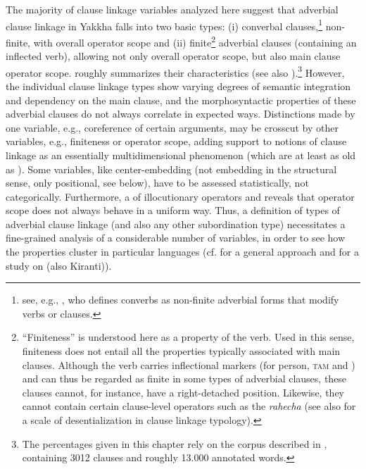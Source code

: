 The majority of clause linkage variables analyzed here  suggest that adverbial clause linkage in Yakkha falls into two basic types: (i) converbal clauses,\footnote{see, e.g., \citet{Haspelmath1995The-converb}, who defines converbs as non-finite adverbial forms that modify verbs or clauses.} non-finite, with overall operator scope and (ii) finite\footnote{“Finiteness” is understood here as a property of the verb. Used in this sense, finiteness does not entail all the properties typically associated with main clauses.  Although the verb carries inflectional markers (for person, \textsc{tam} and ) and can thus be regarded as finite in some types of adverbial clauses, these clauses cannot, for instance, have a right-detached position. Likewise,  they cannot contain certain clause-level operators such as the  \emph{rahecha} (see also \citet[220]{Lehmann1988Towards} for a scale of desentialization in  clause linkage typology).}  adverbial clauses (containing an inflected verb), allowing not only overall operator scope, but also main clause operator scope.  roughly summarizes their  characteristics (see also \citealt{Bierkandtetal_Scope}).\footnote{The percentages given in this chapter rely on the corpus described in , containing 3012 clauses and roughly 13.000 annotated words.} However, the individual clause linkage types show varying degrees of semantic integration and dependency on the main clause, and the morphosyntactic properties of these adverbial clauses do not always correlate in expected ways. Distinctions made by one variable, e.g., coreference of certain arguments, may be crosscut by other variables, e.g., finiteness or operator scope, adding support to notions of clause linkage as an essentially multidimensional phenomenon (which are at least as old as \citealt{HaimanThompson1984_Subordination}). Some variables, like center-embedding (not embedding in the structural sense, only positional, see below), have to be assessed statistically, not categorically. Furthermore, a  of illocutionary operators and  reveals that operator scope does not always behave in a uniform way. Thus, a definition of types of adverbial clause linkage (and also any other subordination type) necessitates a fine-grained ana\-lysis of a considerable number of variables, in order to see how the properties cluster in particular languages (cf. \citet{Bickel2010_Capturing} for a general approach and \citet{Schackowetal2012_Morphosyntactic} for a  study on  (also Kiranti)). 



